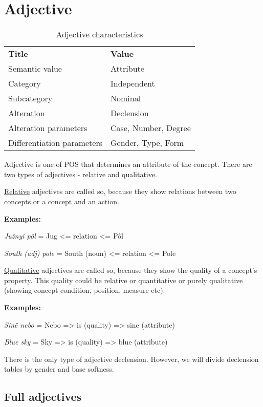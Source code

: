 \section{Adjective}

\begin{table}[h]
	\caption{Adjective characteristics}
	\begin{tabular}{ll}
		\textbf{Title}              & \textbf{Value}               \\
		Semantic value              & Attribute                    \\
		Category                    & Independent                  \\
		Subcategory                 & Nominal                      \\
		Alteration                  & Declension                   \\
		Alteration parameters       & Case, Number, Degree \\
		Differentiation parameters  & Gender, Type, Form
	\end{tabular}
\end{table}

Adjective is one of POS that determines an attribute of the concept. There are two types of adjectives - relative and qualitative. 

\underline{Relative} adjectives are called so, because they show relations between two concepts or a concept and an action.

\textbf{Examples:}

\textit{Južnyǐ pôl} = Jug <= relation <= Pôl

\textit{South (adj) pole} = South (noun) <= relation <= Pole

\underline{Qualitative} adjectives are called so, because they show the quality of a concept’s property. This quality could be relative or quantitative or purely qualitative (showing concept condition, position, measure etc).

\textbf{Examples:}

\textit{Sinë nebo} = Nebo => is (quality) => sine (attribute) 

\textit{Blue sky} = Sky => is (quality) => blue (attribute)

There is the only type of adjective declension. However, we will divide declension tables by gender and base softness.

\subsection{Full adjectives}

